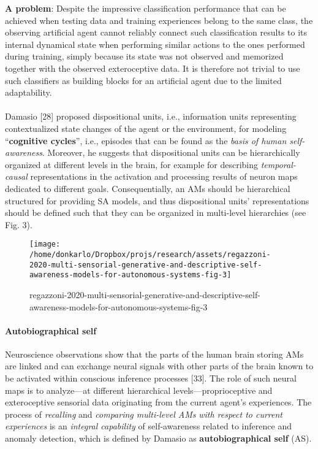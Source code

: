 \documentclass{article}
\begin{document}
			\textbf{A problem}: Despite the impressive classification performance that can be
			achieved when testing data and training experiences belong to
			the same class, the observing artificial agent cannot reliably
			connect such classification results to its internal dynamical
			state when performing similar actions to the ones performed
			during training, simply because its state was not observed and
			memorized together with the observed exteroceptive data. It is therefore not trivial to use such classifiers as building blocks for an artificial agent due to the limited adaptability. 
			
			\paragraph{} Damasio [28] proposed dispositional units, i.e., information units representing contextualized state changes of the
			agent or the environment, for modeling “\textbf{cognitive cycles}”,
			i.e., episodes that can be found as the \emph{basis of human self-awareness}. Moreover, he suggests that dispositional units can
			be hierarchically organized at different levels in the brain, for
			example for describing \emph{temporal-causal} representations in the
			activation and processing results of neuron maps dedicated to
			different goals. Consequentially, an AMs should be hierarchical structured for providing SA models, and thus dispositional
			units’ representations should be defined such that they can be organized in multi-level hierarchies (see Fig. 3).
			\begin{figure*}
				\centering
				\texttt{[image: /home/donkarlo/Dropbox/projs/research/assets/regazzoni-2020-multi-sensorial-generative-and-descriptive-self-awareness-models-for-autonomous-systems-fig-3]}
				\caption{regazzoni-2020-multi-sensorial-generative-and-descriptive-self-awareness-models-for-autonomous-systems-fig-3}
				\label{fig:regazzoni-2020-multi-sensorial-generative-and-descriptive-self-awareness-models-for-autonomous-systems-fig-3.png}
			\end{figure*}
			
			\paragraph{Autobiographical self} Neuroscience observations show that the parts of the human
			brain storing AMs are linked and can exchange neural signals with other parts of the brain known to be activated within conscious inference processes [33]. The role of such neural maps is to analyze—at different hierarchical levels—proprioceptive and exteroceptive sensorial data originating from the current agent’s experiences. The process of \emph{recalling} and \emph{comparing multi-level AMs}\emph{ with respect to current experiences} is an \emph{integral capability} of self-awareness related to inference and anomaly detection, which is defined by Damasio as \textbf{autobiographical self} (AS). 
\end{document}
